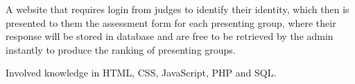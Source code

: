 \documentclass[letterpaper]{deedy-resume} %
\begin{document}
\begin{minipage}[t]{0.66\textwidth}
\vspace{\topsep}
\begin{tightitemize}
\item A website that requires login from judges to identify their identity, which then is presented to them the assessment form for each presenting group,
where their response will be stored in database and are free to be retrieved by the admin instantly to produce the ranking of presenting groups.
\item Involved knowledge in HTML, CSS, JavaScript, PHP and SQL.
\end{tightitemize}
\sectionspace %

\end{minipage}
\end{document}
